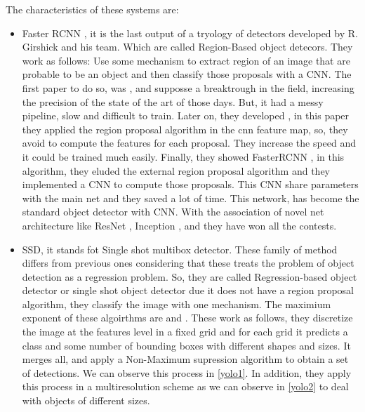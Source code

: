 \documentclass[12pt, a4paper, titlepage,twoside,openright]{article}
\begin{document}
The characteristics of these systems are:
\begin{itemize}

\item Faster RCNN \cite{fasterrcnn}, it is the last output of a tryology of detectors developed by R. Girshick and his team. Which are called Region-Based object detecors. They work as follows: Use some mechanism to extract region of an image that are probable to be an object and then classify those proposals with a CNN. The first paper to do so, was \cite{rcnn}, and supposse a breaktrough in the field, increasing the precision of the state of the art of those days. But, it had a messy pipeline, slow and difficult to train. Later on, they developed \cite{fastrcnn}, in this paper they applied the region proposal algorithm in the cnn feature map, so, they avoid to compute the features for each proposal. They increase the speed and it could be trained much easily. Finally, they showed FasterRCNN \cite{fasterrcnn}, in this algorithm, they eluded the external region proposal algorithm and they implemented a CNN to compute those proposals. This CNN share parameters with the main net and they saved a lot of time. This network, has become the standard object detector with CNN. With the association of novel net architecture like ResNet \cite{resnet}, Inception \cite{inception}, and \cite{pvanet} they have won all the contests.


\item SSD, it stands fot Single shot multibox detector. These family of method differs from previous ones considering that these treats the problem of object detection as a regression problem. So, they are called Regression-based object detector or single shot object detector due it does not have a region proposal algorithm, they classify the image with one mechanism. The maximium exponent of these algoirthms are \cite{yolo} and \cite{ssd}. These work as follows, they discretize the image at the features level in a fixed grid and for each grid it predicts a class and some number of bounding boxes with different shapes and sizes. It merges all, and apply a Non-Maximum supression algorithm to obtain a set of detections. We can observe this process in \ref{yolo1}. In addition, they apply this process in a multiresolution scheme as we can observe in \ref{yolo2} to deal with objects of different sizes.



\end{itemize}
\end{document}
